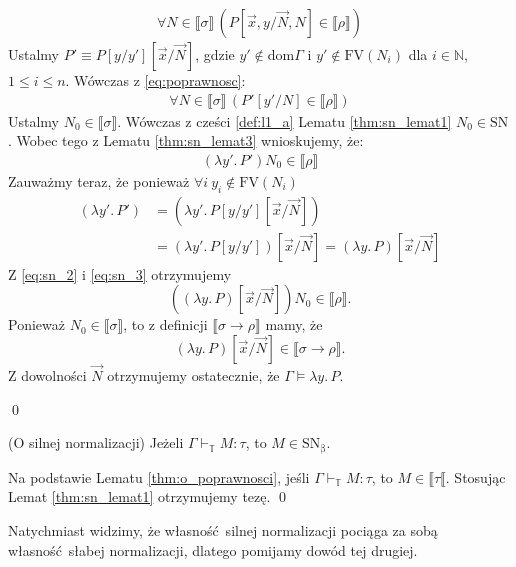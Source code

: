 \begin{dowod}
\begin{enumerate}[label=(\alph*)]
    \begin{align} 
      \forall N\in\llbracket \sigma \rrbracket\, \left(
        P[\vec{x},y/\vec{N},N]\in\llbracket \rho \rrbracket \tag{\textasteriskcentered} \label{eq:poprawnosc}
      \right)
    \end{align} 
      Ustalmy \(P'\equiv P[y/y'][\vec{x}/\vec{N}]\), gdzie \(y'\not\in \mathrm{dom}\Gamma\) i \(y'\not \in \mathrm{FV}(N_i)\) dla \(i\in\mathbb{N}\), \(1\leq i\leq n\). Wówczas z \eqref{eq:poprawnosc}:
      \begin{align*}
        \forall N\in\llbracket\sigma\rrbracket\, \left(
        P'[y'/N]\in\llbracket \rho \rrbracket
        \right )
      \end{align*}
      Ustalmy \(N_0\in\llbracket \sigma \rrbracket\). Wówczas z cześci \ref{def:l1_a} Lematu \ref{thm:sn_lemat1} \(N_0\in\mathrm{SN}\). Wobec tego z Lematu \ref{thm:sn_lemat3} wnioskujemy, że:
      \begin{align}
        (\lambda y'.\,P')N_0\in\llbracket \rho \rrbracket \tag{\textasteriskcentered\textasteriskcentered}\label{eq:sn_2}
      \end{align}
      Zauważmy teraz, że ponieważ \(\forall i\ y_i\not\in\mathrm{FV}(N_i) \)
      \begin{equation}
        \begin{aligned}
        (\lambda y'.\,P')&=(\lambda y'.\,P[y/y'][\vec{x}/\vec{N}])\\
                         &=(\lambda y'.\,P[y/y'])[\vec{x}/\vec{N}]
                         =(\lambda y.\,P)[\vec{x}/\vec{N}] 
        \end{aligned} \tag{\textasteriskcentered\textasteriskcentered\textasteriskcentered}\label{eq:sn_3}
      \end{equation}
      Z \eqref{eq:sn_2} i \eqref{eq:sn_3} otrzymujemy     
      \[
        \left(
          (\lambda y.\,P)[\vec{x}/\vec{N}]
        \right)
        N_0 \in \llbracket \rho \rrbracket .
      \]
      Ponieważ \(N_0\in\llbracket \sigma \rrbracket\), to z definicji \(\llbracket \sigma \to \rho \rrbracket\) mamy, że 
      \[
        (\lambda y.\,P)[\vec{x}/\vec{N}]\in\llbracket \sigma \to \rho \rrbracket.
      \]
      Z dowolności \(\vec{N}\) otrzymujemy ostatecznie, że \(\Gamma\models \lambda y.\,P\).
  \end{enumerate}
  \qed
\end{dowod}
\begin{twierdzenie}(O silnej normalizacji)
  Jeżeli \(\Gamma\vdash_\mathbb{T}M:\tau\), to \(M\in\mathrm{SN_\beta}\).
\end{twierdzenie}
\begin{dowod}
  Na podstawie Lematu \ref{thm:o_poprawnosci}, jeśli \(\Gamma\vdash_\mathbb{T} M:\tau\), to \(M\in\llbracket \tau \llbracket\). Stosując Lemat \ref{thm:sn_lemat1} otrzymujemy tezę. \qed
\end{dowod}

Natychmiast widzimy, że własność silnej normalizacji pociąga za sobą własność słabej normalizacji, dlatego pomijamy dowód tej drugiej.
